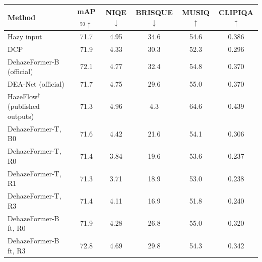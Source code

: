 \begin{tabular}{lccccc}
\toprule
Method & mAP$_{50}\uparrow$ & NIQE$\downarrow$ & BRISQUE$\downarrow$ & MUSIQ$\uparrow$ & CLIPIQA$\uparrow$ \\
\midrule
Hazy input & 71.7 & 4.95 & 34.6 & 54.6 & 0.386 \\
DCP & 71.9 & 4.33 & 30.3 & 52.3 & 0.296 \\
DehazeFormer-B (official) & 72.1 & 4.77 & 32.4 & 54.8 & 0.370 \\
DEA-Net (official) & 71.7 & 4.75 & 29.6 & 55.0 & 0.370 \\
HazeFlow$^\dagger$ (published outputs) & 71.3 & 4.96 & 4.3 & 64.6 & 0.439 \\
DehazeFormer-T, B0 & 71.6 & 4.42 & 21.6 & 54.1 & 0.306 \\
DehazeFormer-T, R0 & 71.4 & 3.84 & 19.6 & 53.6 & 0.237 \\
DehazeFormer-T, R1 & 71.3 & 3.71 & 18.9 & 53.0 & 0.238 \\
DehazeFormer-T, R3 & 71.4 & 4.11 & 16.9 & 51.8 & 0.240 \\
DehazeFormer-B ft, R0 & 71.9 & 4.28 & 26.8 & 55.0 & 0.320 \\
DehazeFormer-B ft, R3 & 72.8 & 4.69 & 29.8 & 54.3 & 0.342 \\
\bottomrule
\end{tabular}